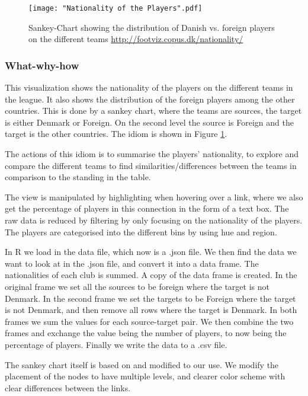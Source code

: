 \documentclass[Report.tex]{subfiles}
\begin{document}
\begin{figure}
\center
\texttt{[image: "Nationality of the Players".pdf]}
\caption{Sankey-Chart showing the distribution of Danish vs. foreign players on the different teams \url{http://footviz.copus.dk/nationality/}}
\label{Fig:Nationality}
\end{figure}


\subsubsection{What-why-how}

This visualization shows the nationality of the players on the different teams in the league. It also shows the distribution of the foreign players among the other countries. This is done by a sankey chart, where the teams are sources, the target is either Denmark or Foreign. On the second level the source is Foreign and the target is the other countries. The idiom is shown in Figure \ref{Fig:Nationality}.

The actions of this idiom is to summarise the players' nationality, to explore and compare the different teams to find similarities/differences between the teams in comparison to the standing in the table. 

The view is manipulated by highlighting when hovering over a link, where we also get the percentage of players in this connection in the form of a text box. The raw data is reduced by filtering by only focusing on the nationality of the players. The players are categorised into the different bins by using hue and region.

In R we load in the data file, which now is a .json file. We then find the data we want to look at in the .json file, and convert it into a data frame. The nationalities of each club is summed. A copy of the data frame is created. In the original frame we set all the sources to be foreign where the target is not Denmark. In the second frame we set the targets to be Foreign where the target is not Denmark, and then remove all rows where the target is Denmark. In both frames we sum the values for each source-target pair. We then combine the two frames and exchange the value being the number of players, to now being the percentage of players. Finally we write the data to a .csv file.

The sankey chart itself is based on \cite{Sankey} and modified to our use. We modify the placement of the nodes to have multiple levels, and clearer color scheme with clear differences between the links.
\end{document}
